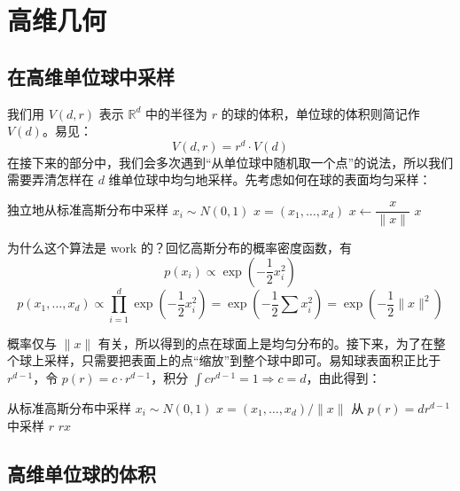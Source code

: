 \chapter{高维几何}

\section{在高维单位球中采样}

我们用 $V(d,r)$ 表示 $\mathbb{R}^{d}$ 中的半径为 $r$ 的球的体积，单位球的体积则简记作 $V(d)$。易见：
\[
	V(d,r) = r^{d} \cdot V(d)
\]
在接下来的部分中，我们会多次遇到“从单位球中随机取一个点”的说法，所以我们需要弄清怎样在 $d$ 维单位球中均匀地采样。先考虑如何在球的表面均匀采样：

\begin{algorithm}[h]
    \caption{单位球表面的采样}
    \begin{algorithmic}[1]
            \State 独立地从标准高斯分布中采样 $x_i \sim N(0, 1)$
        \EndFor
        \State $x = (x_1, \dots, x_d)$
        \State $x \leftarrow \dfrac{x}{\|x\|}$
        \State \Return $x$
    \end{algorithmic}
\end{algorithm}

为什么这个算法是 work 的？回忆高斯分布的概率密度函数，有
\[
	p(x_{i}) \propto \exp\left(-\frac{1}{2}x_{i}^{2}\right)
\]
\[
	p(x_{1}, \dots, x_{d}) \propto \prod_{i=1}^{d} \exp\left(-\frac{1}{2}x_{i}^{2}\right) = \exp\left(-\frac{1}{2}\sum x_{i}^{2}\right) = \exp\left(-\frac{1}{2}\|x\|^{2}\right)
\]

概率仅与 $\|x\|$ 有关，所以得到的点在球面上是均匀分布的。接下来，为了在整个球上采样，只需要把表面上的点“缩放”到整个球中即可。易知球表面积正比于 $r^{d-1}$，令 $p(r) = c \cdot r^{d-1}$，积分 $\int c r^{d-1} = 1 \Rightarrow c=d$，由此得到：

\begin{algorithm}[h]
    \caption{单位球中的采样}
    \begin{algorithmic}[1]
            \State 从标准高斯分布中采样 $x_i \sim N(0, 1)$
        \EndFor
        \State $x = (x_1, \dots, x_d) / \|x\|$
        \State 从 $p(r) = d r^{d-1}$ 中采样 $r$
        \State \Return $rx$
    \end{algorithmic}
\end{algorithm}

\section{高维单位球的体积}

